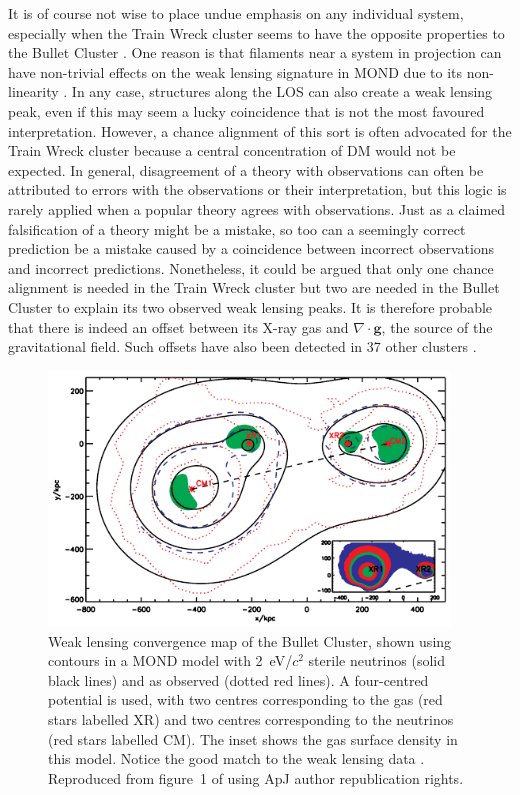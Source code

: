 \documentclass[fleqn,usenatbib,useAMS]{mnras} %
\begin{document}
It is of course not wise to place undue emphasis on any individual system, especially when the Train Wreck cluster seems to have the opposite properties to the Bullet Cluster \citep[as briefly reviewed in][]{Deshev_2017}. One reason is that filaments near a system in projection can have non-trivial effects on the weak lensing signature in MOND due to its non-linearity \citep{Feix_2008}. In any case, structures along the LOS can also create a weak lensing peak, even if this may seem a lucky coincidence that is not the most favoured interpretation. However, a chance alignment of this sort is often advocated for the Train Wreck cluster because a central concentration of DM would not be expected. In general, disagreement of a theory with observations can often be attributed to errors with the observations or their interpretation, but this logic is rarely applied when a popular theory agrees with observations. Just as a claimed falsification of a theory might be a mistake, so too can a seemingly correct prediction be a mistake caused by a coincidence between incorrect observations and incorrect predictions. Nonetheless, it could be argued that only one chance alignment is needed in the Train Wreck cluster but two are needed in the Bullet Cluster to explain its two observed weak lensing peaks. It is therefore probable that there is indeed an offset between its X-ray gas and $\nabla \cdot \bm{g}$, the source of the gravitational field. Such offsets have also been detected in 37 other clusters \citep{Shan_2010}.

\begin{figure}
	\centering
	\includegraphics[width=0.95\textwidth]{Angus_2007_Figure_1}
	\caption{Weak lensing convergence map of the Bullet Cluster, shown using contours in a MOND model with 2~eV/$c^2$ sterile neutrinos (solid black lines) and as observed (dotted red lines). A four-centred potential is used, with two centres corresponding to the gas (red stars labelled XR) and two centres corresponding to the neutrinos (red stars labelled CM). The inset shows the gas surface density in this model. Notice the good match to the weak lensing data \citep{Clowe_2006}. Reproduced from figure~1 of \citet{Angus_2007} using ApJ author republication rights.}
	\label{Angus_2007_Figure_1}
\end{figure}
\end{document}
